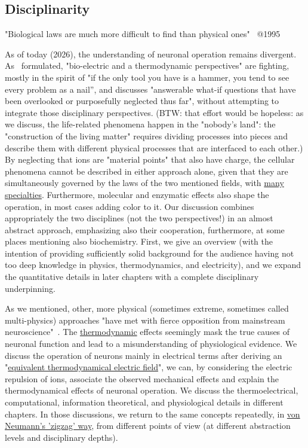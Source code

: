 \subsection[Disciplinarity]{Disciplinarity\label{sec:SINGLE_ModelDisciplinarity}}


\quotationbox
{
"Biological laws are much more difficult to find than physical ones"~\cite{VollmerLimitsOfBiology:1995} @1995
}

As of today (2026), the understanding of neuronal operation remains divergent. As~\cite{PerspectivesNerveSignalPropagation:2024} formulated,
"bio-electric and a thermodynamic perspectives" are fighting,
mostly in the spirit of "if the only tool you have is a hammer, you tend to see every problem as a nail”,
and discusses "answerable what-if questions that have been overlooked or purposefully neglected thus far", without attempting to integrate those
disciplinary perspectives. (BTW: that effort would be hopeless: 
as we discuss, the life-related phenomena happen in the "nobody's land":
the "construction of the living matter" requires dividing processes 
into pieces and describe them with different physical processes that
are interfaced to each other.) 
 By neglecting that ions are "material
points" that also have charge, the cellular phenomena cannot be described in either approach alone, given that they are simultaneously governed by the laws of 
the two mentioned fields, with \hyperlink{ThermodynamicsSpecialties}{many specialties}. Furthermore, molecular and enzymatic effects also shape the operation, in most cases adding color to it. Our discussion
combines appropriately the two disciplines (not the two perspectives!) in an almost abstract approach, emphasizing also their cooperation, furthermore, at some places mentioning also biochemistry.
First, we give an overview (with the intention of providing
sufficiently solid background for the audience having not too deep knowledge in physics, thermodynamics, and electricity), and we expand the
quantitative details in later chapters with a complete disciplinary underpinning.

As we mentioned, other, more physical (sometimes extreme, sometimes called multi-physics) approaches "have met with fierce opposition from mainstream neuroscience"~\cite{NerveSignalAsWindow:2023}. The
\hyperlink{Thermodynamics}{thermodynamic} effects seemingly mask the true causes of neuronal function and lead to a misunderstanding of physiological evidence.
We discuss the operation of neurons mainly in electrical terms after deriving an "\hyperlink{ThermodynamicElectricField}{equivalent thermodynamical electric field}", we can,
by considering the electric repulsion of ions, associate the observed mechanical effects and explain the thermodynamical effects of neuronal operation.
We discuss the thermoelectrical, computational, information theoretical, and physiological details in
different chapters. In those discussions, we return to the same concepts repeatedly, in \hyperlink{zigzagdiscussion}{von Neumann's 'zigzag' way}, from different points of view (at different abstraction levels and disciplinary depths).


